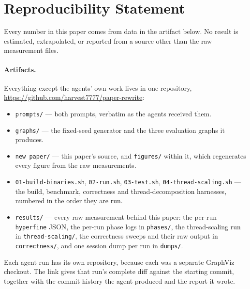 \section*{Reproducibility Statement}
\label{sec:repro}

Every number in this paper comes from data in the artifact below. No result is
estimated, extrapolated, or reported from a source other than the raw
measurement files.

\paragraph{Artifacts.}
Everything except the agents' own work lives in one repository,
\url{https://github.com/harvest7777/paper-rewrite}:

\begin{itemize}
\item \texttt{prompts/} --- both prompts, verbatim as the agents received them.
\item \texttt{graphs/} --- the fixed-seed generator and the three evaluation
      graphs it produces.
\item \texttt{new paper/} --- this paper's source, and \texttt{figures/} within
      it, which regenerates every figure from the raw measurements.
\item \texttt{01-build-binaries.sh}, \texttt{02-run.sh},
      \texttt{03-test.sh}, \texttt{04-thread-scaling.sh} --- the build,
      benchmark, correctness and thread-decomposition harnesses, numbered in the
      order they are run.
\item \texttt{results/} --- every raw measurement behind this paper: the per-run
      \texttt{hyperfine} JSON, the per-run phase logs in \texttt{phases/}, the
      thread-scaling run in \texttt{thread-scaling/}, the correctness sweeps and
      their raw output in \texttt{correctness/}, and one session dump per run in
      \texttt{dumps/}.
\end{itemize}

Each agent run has its own repository, because each was a separate GraphViz
checkout. The link gives that run's complete diff against the starting commit,
together with the commit history the agent produced and the report it wrote.

